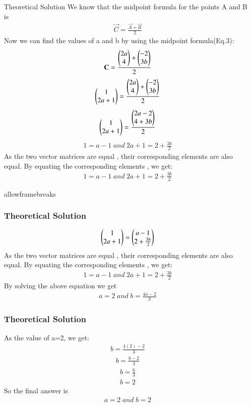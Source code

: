 \documentclass{beamer}
\begin{document}
\begin{frame}{Theoretical Solution}
We know that the midpoint formula for the points A and B is
\begin{align}
    \vec{C}=\frac{\vec{A}+\vec{B}}{2}
\end{align}
Now we can find the values of a and b by using the midpoint formula(Eq.3):
\begin{align}
    \mathbf{C}=\frac{\begin{pmatrix}2a\\4\end{pmatrix} +\begin{pmatrix}-2\\3b\end{pmatrix}}{2}
\end{align}
\begin{align}
    \begin{pmatrix}1\\2a+1\end{pmatrix}=\frac{\begin{pmatrix}2a\\4\end{pmatrix} +\begin{pmatrix}-2\\3b\end{pmatrix}}{2}
\end{align}
\begin{align}
    \begin{pmatrix}1\\2a+1\end{pmatrix}=\frac{\begin{pmatrix}2a-2\\4+3b\end{pmatrix}}{2}
\end{align}
\begin{align}
    1=a-1 \;and\;2a+1=2+\frac{3b}{2}
\end{align}
As the two vector matrices are equal , their corresponding elements are also equal. By equating the corresponding elements , we get:
\begin{align}
    1=a-1 \;and\;2a+1=2+\frac{3b}{2}
\end{align}
\end{frame}
\begin{frame}{allowframebreaks}
\frametitle{Theoretical Solution}
  \begin{align}
    \begin{pmatrix}1\\2a+1\end{pmatrix}=\begin{pmatrix}a-1\\2+\frac{3b}{2}\end{pmatrix}
\end{align}
As the two vector matrices are equal , their corresponding elements are also equal. By equating the corresponding elements , we get:
\begin{align}
    1=a-1 \;and\;2a+1=2+\frac{3b}{2}
\end{align}
By solving the above equation we get 
\begin{align}
    a=2\;and\;b=\frac{4a-2}{3}
\end{align}

\end{frame}
\begin{frame}
\frametitle{Theoretical Solution}
As the value of a=2, we get:
\begin{align}
b=\frac{4(2)-2}{3} 
\end{align}
\begin{align}
b=\frac{8-2}{3}
\end{align}
\begin{align}
b=\frac{6}{3}
\end{align}
\begin{align}
    b=2
\end{align}
So the final answer is
\begin{align}
    a=2\;and \;b=2
\end{align}
\end{frame}
\end{document}
